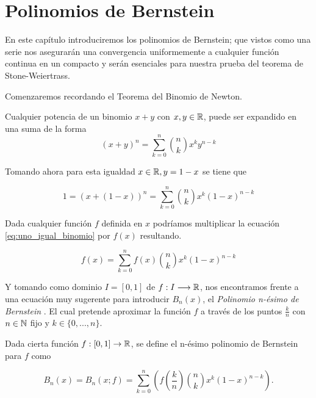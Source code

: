 %

\chapter{Polinomios de Bernstein}\label{ch:Bernstein}  

En este capítulo introduciremos los polinomios de Bernstein;   que vistos como una serie nos asegurarán una convergencia uniformemente a cualquier función continua en un compacto y serán esenciales para nuestra prueba del teorema de Stone-Weiertrass.  

Comenzaremos recordando el Teorema del Binomio de Newton. 


\begin{teorema}
    Cualquier potencia de un binomio $x+y$ con $x,y \in \mathbb{R}$,  puede ser expandido en una suma de la forma
    \[(x+y)^n = \sum_{k=0}^n \binom{n}{k} x^{k}y^{n-k}\]
\end{teorema}  

Tomando ahora para esta igualdad $x \in \mathbb{R}, y= 1-x$ se tiene que 

\begin{equation}\label{eq:uno_igual_binomio}
    1 = (x+ (1-x))^n = \sum_{k=0}^n \binom{n}{k} x^{k} (1-x)^{n-k}
\end{equation}

Dada cualquier función $f$ definida en $x$ podríamos multiplicar la ecuación 
\eqref{eq:uno_igual_binomio} por $f(x)$ resultando. 

\begin{equation}\label{eq:f_igual_binomio}
    f(x) = \sum_{k=0}^n f(x) \binom{n}{k} x^{k} (1-x)^{n-k}
\end{equation} 

Y tomando como dominio $I=[0,1]$ de $f: I \longrightarrow \mathbb{R}$,
 nos encontramos
frente a una ecuación muy sugerente para introducir $B_n(x)$, el \textit{Polinomio n-ésimo  de Bernstein }. 
El cual pretende  aproximar la función $f$ a través de los puntos $\frac{k}{n}$ con $n \in \mathbb{N}$ fijo
y $k \in \{0,...,n \}.$

\begin{definicion} \label{def:Bernstein}
    Dada cierta función $f: [0,1] \rightarrow \mathbb{R}$, se define el n-ésimo polinomio de Bernstein para $f$ como 

    $$B_n(x) = B_n(x;f)=\sum_ {k=0}^{n} \left( f \left( \frac{k}{n} \right) \binom{n}{k} x^k (1-x)^{n-k} \right) .$$

\end{definicion}

